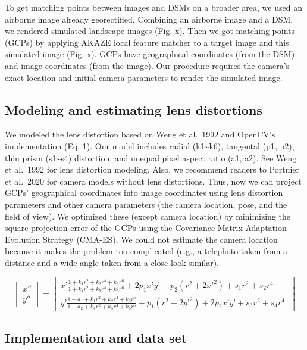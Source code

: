 \documentclass{article}
\begin{document}
To get matching points between images and DSMs on a broader area, we
used an airborne image already georectified. Combining an airborne image
and a DSM, we rendered simulated landscape images (Fig. x). Then we got
matching points (GCPs) by applying AKAZE local feature matcher to a
target image and this simulated image (Fig. x). GCPs have geographical
coordinates (from the DSM) and image coordinates (from the image). Our
procedure requires the camera's exact location and initial camera
parameters to render the simulated image.

\hypertarget{modeling-and-estimating-lens-distortions}{%
\subsection{Modeling and estimating lens
distortions}\label{modeling-and-estimating-lens-distortions}}

We modeled the lens distortion based on Weng et al.~1992 and OpenCV's
implementation (Eq. 1). Our model includes radial
(k1\textasciitilde k6), tangental (p1, p2), thin prism
(s1\textasciitilde s4) distortion, and unequal pixel aspect ratio (a1,
a2). See Weng et al.~1992 for lens distortion modeling. Also, we
recommend readers to Portnier et al.~2020 for camera models without lens
distortions. Thus, now we can project GCPs' geographical coordinates
into image coordinates using lens distortion parameters and other camera
parameters (the camera location, pose, and the field of view). We
optimized these (except camera location) by minimizing the square
projection error of the GCPs using the Covariance Matrix Adaptation
Evolution Strategy (CMA-ES). We could not estimate the camera location
because it makes the problem too complicated (e.g., a telephoto taken
from a distance and a wide-angle taken from a close look similar).

\[
\begin{bmatrix}
{x}'' \\ 
{y}'' 
\end{bmatrix} 
= 
\begin{bmatrix} 
x’ \frac{1 + k_1 r^2 + k_2 r^4 + k_3 r^6}{1 + k_4 r^2 + k_5 r^4 + k_6 r^6} + 2 p_1 x’ y’ + p_2(r^2 + 2 x’^2) + s_1 r^2 + s_2 r^4 \\ 
y’ \frac{1 + a_1 + k_1 r^2 + k_2 r^4 + k_3 r^6}{1 + a_2 + k_4 r^2 + k_5 r^4 + k_6 r^6} + p_1 (r^2 + 2 y’^2) + 2 p_2 x’ y’ + s_3 r^2 + s_4 r^4 \ \end{bmatrix}
\]

\hypertarget{implementation-and-data-set}{%
\subsection{Implementation and data
set}\label{implementation-and-data-set}}
\end{document}
